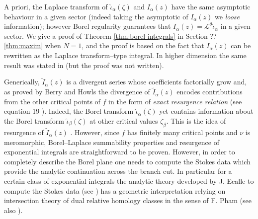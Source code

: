 \documentclass[11pt,a4paper,twoside,leqno,noamsfonts]{amsart}
\numberwithin{equation}{section}
\begin{document}
\begin{itemize}
A priori, the Laplace transform of $\hat{\iota}_\alpha(\zeta)$ and $I_{\alpha}(z)$ have the same asymptotic behaviour in a given sector (indeed taking the asymptotic of $I_\alpha(z)$ we \textit{loose} information); however Borel regularity guarantees that $I_{\alpha}(z)=\mathcal{L}^{\theta}\hat{\iota}_{\alpha}$ in a given sector. We give a proof of Theorem \ref{thm:borel integrals} in Section ?? \ref{thm:maxim} when $N=1$, and the proof is based on the fact that $I_\alpha(z)$ can be rewritten as the Laplace transform--type integral. In higher dimension the same result was stated in \cite{Dunne-Unsal 15} (but the proof was not written).

Generically, $\tilde{I}_{\alpha}(z)$ is a divergent series whose coefficients factorially grow and, as proved by Berry and Howls \cite{BH}\cite{H} the divergence of $\tilde{I}_{\alpha}(z)$ encodes contributions from the other critical points of $f$ in the form of \textit{exact resurgence relation} (see equation 19 \cite{BH}). Indeed, the Borel transform $\hat{\iota}_\alpha(\zeta)$ yet contains information about the Borel transform $\hat{\iota}_{\beta}(\zeta)$ at other critical values $\zeta_\beta$. This is the idea of resurgence of $\tilde{I}_{\alpha}(z)$ \cite{EcalleI}\cite{EcalleII}\cite{EcalleIII}. However, since $f$ has finitely many critical points and $\nu$ is meromorphic, Borel--Laplace summability properties and resurgence of exponential integrals are straightforward to be proven. However, in order to completely describe the Borel plane one needs to compute the Stokes data which provide the analytic continuation across the branch cut. In particular for a certain class of exponential integrals the analytic theory developed by J. Ecalle to compute the Stokes data (see \cite{Ecalle}\cite{diverg-resurg-i}\cite{Dorigoni}\cite{Schiappa}) has a geometric interpretation relying on intersection theory of dual relative homology classes in the sense of F. Pham \cite{pham} (see also \cite{Maxim_lectures}\cite{Maxim_slide_ERC}).   
\end{itemize}
\end{document}
